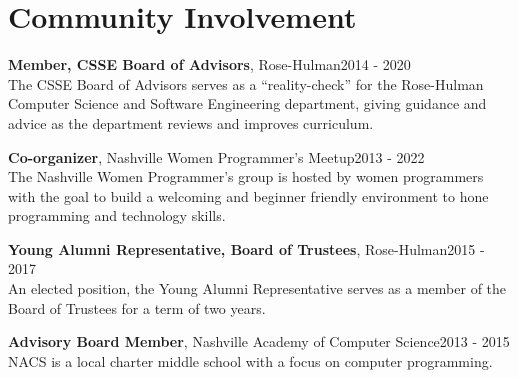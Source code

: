 \section{Community Involvement}

{\bf Member, CSSE Board of Advisors}, Rose-Hulman\hfill 2014 - 2020\\
The CSSE Board of Advisors serves as a ``reality-check'' for the Rose-Hulman Computer Science and Software Engineering department, giving guidance and advice as the department reviews and improves curriculum.

{\bf Co-organizer}, Nashville Women Programmer's Meetup\hfill 2013 - 2022\\
The Nashville Women Programmer's group is hosted by women programmers with the goal to build a welcoming and beginner friendly environment to hone programming and technology skills.

{\bf Young Alumni Representative, Board of Trustees}, Rose-Hulman\hfill 2015 - 2017\\
An elected position, the Young Alumni Representative serves as a member of the Board of Trustees for a term of two years.

{\bf Advisory Board Member}, Nashville Academy of Computer Science\hfill 2013 - 2015\\
NACS is a local charter middle school with a focus on computer programming.
